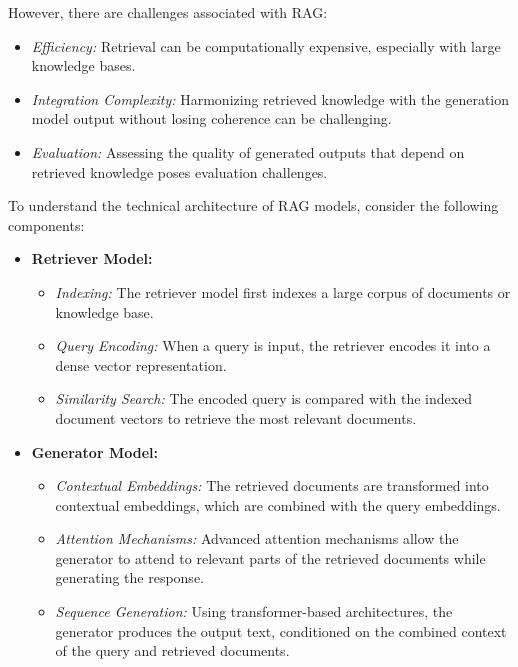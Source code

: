 \newpage
\hfill \break
However, there are challenges associated with RAG:
\begin{itemize}
    \item \textit{Efficiency:} Retrieval can be computationally expensive, especially with large knowledge bases.
    \item \textit{Integration Complexity:} Harmonizing retrieved knowledge with the generation model output without losing coherence can be challenging.
    \item \textit{Evaluation:} Assessing the quality of generated outputs that depend on retrieved knowledge poses evaluation challenges.
\end{itemize}

To understand the technical architecture of RAG models, consider the following components:
\begin{itemize}
    \item \textbf{Retriever Model:}
    \begin{itemize}
        \item \textit{Indexing:} The retriever model first indexes a large corpus of documents or knowledge base.
        \item \textit{Query Encoding:} When a query is input, the retriever encodes it into a dense vector representation.
        \item \textit{Similarity Search:} The encoded query is compared with the indexed document vectors to retrieve the most relevant documents.
    \end{itemize}

    \item \textbf{Generator Model:}
    \begin{itemize}
        \item \textit{Contextual Embeddings:} The retrieved documents are transformed into contextual embeddings, which are combined with the query embeddings.
        \item \textit{Attention Mechanisms:} Advanced attention mechanisms allow the generator to attend to relevant parts of the retrieved documents while generating the response.
        \item \textit{Sequence Generation:} Using transformer-based architectures, the generator produces the output text, conditioned on the combined context of the query and retrieved documents.
    \end{itemize}
\end{itemize}

\newpage

